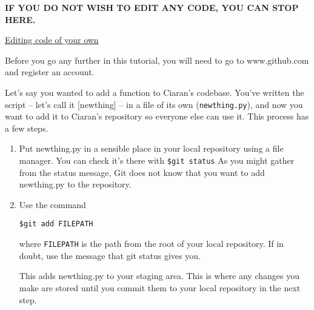 \documentclass[11pt, a4paper, english]{article}
\begin{document}
\textbf{IF YOU DO NOT WISH TO EDIT ANY CODE, YOU CAN STOP HERE.}

\underline{Editing code of your own}

Before you go any further in this tutorial, you will need to go to www.github.com and register an account.

Let's say you wanted to add a function to Ciaran's codebase. You've written the script -- let's call it [newthing] -- in a file of its own (\verb|newthing.py|), and now you want to add it to Ciaran's repository so everyone else can use it. This process has a few steps.

\begin{enumerate}
\item Put newthing.py in a sensible place in your local repository using a file manager. You can check it's there with \verb|$git status|
As you might gather from the status message, Git does not know that you want to add newthing.py to the repository.
\item Use the command
\begin{verbatim}
$git add FILEPATH
\end{verbatim}
where \verb|FILEPATH| is the path from the root of your local repository. If in doubt, use the message that git status gives you.

This adds newthing.py to your staging area. This is where any changes you make are stored until you commit them to your local repository in the next step.


\end{enumerate}
\end{document}
